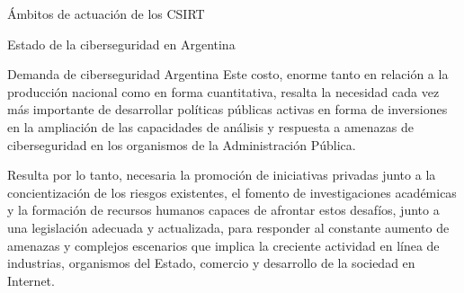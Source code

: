 \begin{section}{Ámbitos de actuación de los CSIRT}
\begin{subsection}{Estado de la ciberseguridad en Argentina}
\begin{subsubsection}{Demanda de ciberseguridad Argentina}
        \FloatBarrier
        Este costo, enorme tanto en relación a la producción nacional como en forma cuantitativa, resalta la necesidad cada vez más importante de desarrollar políticas públicas activas en forma de inversiones en la ampliación de las capacidades de análisis y respuesta a amenazas de ciberseguridad en los organismos de la Administración Pública. \par
        Resulta por lo tanto, necesaria la promoción de iniciativas privadas junto a la concientización de los riesgos existentes, el fomento de investigaciones académicas y la formación de recursos humanos capaces de afrontar estos desafíos, junto a una legislación adecuada y actualizada, para responder al constante aumento de amenazas y complejos escenarios que implica la creciente actividad en línea de industrias, organismos del Estado, comercio y desarrollo de la sociedad en Internet. \par

            \end{subsubsection}
        \end{subsection}
   \end{section}

